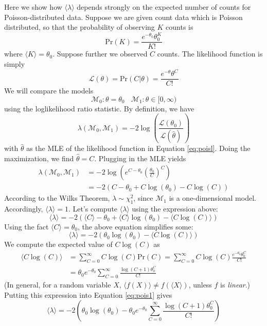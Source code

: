 \documentclass[aps,pra, twocolumn]{revtex4}
\newcommand{\M}{\mathcal{M}}
\newcommand{\cL}{\mathcal{L}}
\begin{document}
Here we show how $\langle \lambda \rangle$ depends strongly on the expected number of counts for Poisson-distributed data.
Suppose we are given count data which is Poisson distributed, so that the probability of observing $K$ counts is
\begin{equation}
\mathrm{Pr}(K) = \frac{e^{-\theta_{0}}\theta_{0}^{K}}{K!}
\end{equation}
where $\langle K \rangle = \theta_{0}$. Suppose further we observed 
$C$ counts. The likelihood function is simply
\begin{equation}
\label{eq:poisl}
\cL(\theta) = \mathrm{Pr}(C|\theta) = \frac{e^{-\theta}\theta^{C}}{C!}
\end{equation}
We will compare the models
\[\M_{0}: \theta = \theta_{0}~~~~\M_{1}: \theta \in [0, \infty)\]
using the loglikelihood ratio statistic. By definition, we have
\begin{equation}
\lambda(\M_{0}, \M_{1}) = -2 \log \left(\frac{\mathcal{L}(\theta_{0})}{\mathcal{L}(\hat{\theta})}\right)
\end{equation}
with $\hat{\theta}$ as the MLE of the likelihood function in Equation \eqref{eq:poisl}. Doing the maximization, we find $\hat{\theta} = C$.
Plugging in the MLE yields
\begin{align}
\nonumber \lambda(\M_{0}, \M_{1}) &= -2 \log \left(e^{C-\theta_{0}}\left(\frac{\theta_{0}}{C}\right)^{C}\right)\\
&= -2 \left(C - \theta_{0} + C \log(\theta_{0}) - C \log (C)\right)
\end{align}
According to the Wilks Theorem, $\lambda \sim \chi^{2}_{1}$, since $\M_{1}$ is a one-dimensional model. Accordingly, $\langle 
\lambda \rangle = 1$. Let's compute $\langle \lambda \rangle$ using the expression above:
\begin{equation}
\langle \lambda \rangle = -2 ( \langle C \rangle - \theta_{0} + \langle C \rangle \log(\theta_{0}) - \langle C \log (C)\rangle)
\end{equation}
Using the fact $\langle C \rangle = \theta_{0}$, the above equation simplifies some:
\begin{equation}
\label{eq:pois1}
\langle \lambda \rangle = -2 ( \theta_{0} \log(\theta_{0}) - \langle C \log (C)\rangle)
\end{equation}
We compute the expected value of $C\log(C)$ as
\begin{align*}
\langle C \log(C) \rangle &= \sum_{C=0}^{\infty}C \log (C) \mathrm{Pr}(C) = \sum_{C=0}^{\infty}C \log(C) \frac{e^{-\theta_{0}}
\theta_{0}^{C}}{C!}\\
&= \theta_{0}e^{-\theta_{0}}\sum_{C=0}^{\infty}\frac{\log (C + 1) \theta_{0}^{C}}{C!}
\end{align*}
(In general, for a random variable $X$, $\langle f(X)\rangle \neq f(\langle X \rangle)$, unless $f$ is \emph{linear}.)
Putting this expression into Equation \eqref{eq:pois1} gives
\begin{equation}
\label{eq:pois2}
\langle \lambda \rangle = -2 \left( \theta_{0} \log(\theta_{0}) - \theta_{0}e^{-\theta_{0}}\sum_{C=0}^{\infty}\frac{\log (C + 1) 
\theta_{0}^{C}}{C!}\right)
\end{equation}
\end{document}
